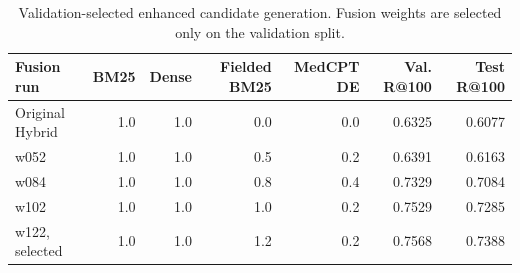 \begin{table}[t]
\centering
\small
\caption{Validation-selected enhanced candidate generation. Fusion weights are selected only on the validation split.}
\label{tab:enhanced-candidate-selection}
\begin{tabular}{lrrrrrr}
\toprule
Fusion run & BM25 & Dense & Fielded BM25 & MedCPT DE & Val. R@100 & Test R@100 \\
\midrule
Original Hybrid & 1.0 & 1.0 & 0.0 & 0.0 & 0.6325 & 0.6077 \\
w052 & 1.0 & 1.0 & 0.5 & 0.2 & 0.6391 & 0.6163 \\
w084 & 1.0 & 1.0 & 0.8 & 0.4 & 0.7329 & 0.7084 \\
w102 & 1.0 & 1.0 & 1.0 & 0.2 & 0.7529 & 0.7285 \\
w122, selected & 1.0 & 1.0 & 1.2 & 0.2 & 0.7568 & 0.7388 \\
\bottomrule
\end{tabular}
\end{table}
